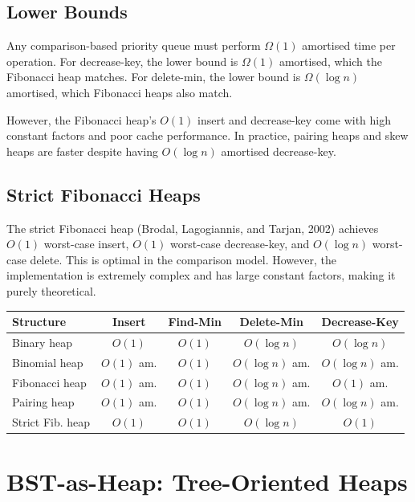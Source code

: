 \subsection{Lower Bounds}

Any comparison-based priority queue must perform $\Omega(1)$ amortised time per operation. For decrease-key, the lower bound is $\Omega(1)$ amortised, which the Fibonacci heap matches. For delete-min, the lower bound is $\Omega(\log n)$ amortised, which Fibonacci heaps also match.

However, the Fibonacci heap's $O(1)$ insert and decrease-key come with high constant factors and poor cache performance. In practice, pairing heaps and skew heaps are faster despite having $O(\log n)$ amortised decrease-key.

\subsection{Strict Fibonacci Heaps}

The strict Fibonacci heap (Brodal, Lagogiannis, and Tarjan, 2002) achieves $O(1)$ worst-case insert, $O(1)$ worst-case decrease-key, and $O(\log n)$ worst-case delete. This is optimal in the comparison model. However, the implementation is extremely complex and has large constant factors, making it purely theoretical.

\begin{center}
\begin{tabular}{lcccc}
\toprule
Structure & Insert & Find-Min & Delete-Min & Decrease-Key \\
\midrule
Binary heap & $O(1)$ & $O(1)$ & $O(\log n)$ & $O(\log n)$ \\
Binomial heap & $O(1)$ am. & $O(1)$ & $O(\log n)$ am. & $O(\log n)$ am. \\
Fibonacci heap & $O(1)$ am. & $O(1)$ & $O(\log n)$ am. & $O(1)$ am. \\
Pairing heap & $O(1)$ am. & $O(1)$ & $O(\log n)$ am. & $O(\log n)$ am. \\
Strict Fib. heap & $O(1)$ & $O(1)$ & $O(\log n)$ & $O(1)$ \\
\bottomrule
\end{tabular}
\end{center}

\section{BST-as-Heap: Tree-Oriented Heaps}
\label{sec:bst-as-heap}

